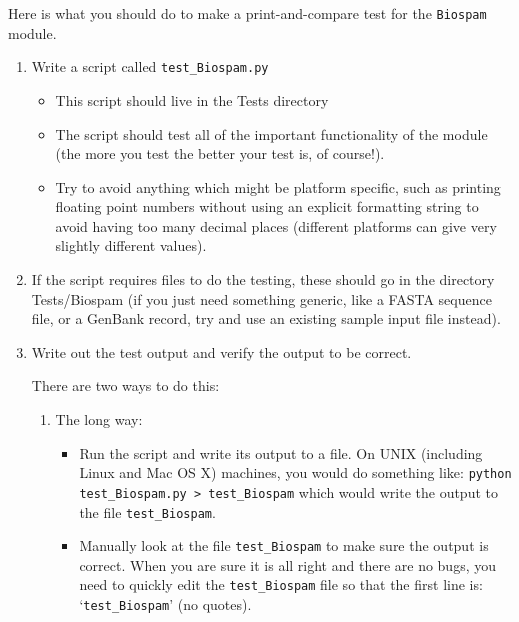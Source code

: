 \documentclass{report}
\begin{document}
Here is what you should do to make a print-and-compare test for the
\verb|Biospam| module.

\begin{enumerate}
  \item Write a script called \verb|test_Biospam.py|

  \begin{itemize}

    \item This script should live in the Tests directory
      
     \item The script should test all of the important functionality
     of the module (the more you test the better your test is, of course!).
    
     \item Try to avoid anything which might be platform specific,
     such as printing floating point numbers without using an explicit
     formatting string to avoid having too many decimal places
     (different platforms can give very slightly different values).

  \end{itemize}
      
  \item If the script requires files to do the testing, these should go in
       the directory Tests/Biospam (if you just need something generic, like
       a FASTA sequence file, or a GenBank record, try and use an existing
       sample input file instead).
      
  \item Write out the test output and verify the output to be correct.

       There are two ways to do this:

  \begin{enumerate}
    \item The long way:

    \begin{itemize}
      
     \item Run the script and write its output to a file. On UNIX (including
       Linux and Mac OS X) machines, you would do something like:
       \verb|python test_Biospam.py > test_Biospam| which would write the
       output to the file \verb|test_Biospam|.
      
     \item Manually look at the file \verb|test_Biospam| to make sure the output is correct. When you are sure it is all right and there are no bugs, you need to quickly edit the \verb|test_Biospam| file so that the first line is: `\verb|test_Biospam|' (no quotes).


\end{itemize}
\end{enumerate}
\end{enumerate}
\end{document}
